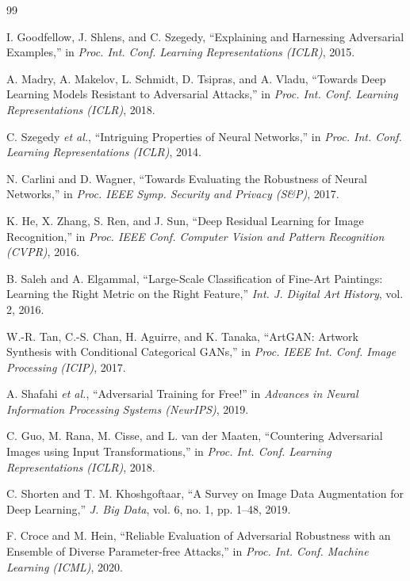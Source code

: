 \documentclass[conference]{IEEEtran}
\begin{document}
\begin{thebibliography}{99}

I. Goodfellow, J. Shlens, and C. Szegedy, ``Explaining and Harnessing Adversarial Examples,'' in \textit{Proc. Int. Conf. Learning Representations (ICLR)}, 2015.

A. Madry, A. Makelov, L. Schmidt, D. Tsipras, and A. Vladu, ``Towards Deep Learning Models Resistant to Adversarial Attacks,'' in \textit{Proc. Int. Conf. Learning Representations (ICLR)}, 2018.

C. Szegedy \textit{et al.}, ``Intriguing Properties of Neural Networks,'' in \textit{Proc. Int. Conf. Learning Representations (ICLR)}, 2014.

N. Carlini and D. Wagner, ``Towards Evaluating the Robustness of Neural Networks,'' in \textit{Proc. IEEE Symp. Security and Privacy (S\&P)}, 2017.

K. He, X. Zhang, S. Ren, and J. Sun, ``Deep Residual Learning for Image Recognition,'' in \textit{Proc. IEEE Conf. Computer Vision and Pattern Recognition (CVPR)}, 2016.

B. Saleh and A. Elgammal, ``Large-Scale Classification of Fine-Art Paintings: Learning the Right Metric on the Right Feature,'' \textit{Int. J. Digital Art History}, vol. 2, 2016.

W.-R. Tan, C.-S. Chan, H. Aguirre, and K. Tanaka, ``ArtGAN: Artwork Synthesis with Conditional Categorical GANs,'' in \textit{Proc. IEEE Int. Conf. Image Processing (ICIP)}, 2017.

A. Shafahi \textit{et al.}, ``Adversarial Training for Free!'' in \textit{Advances in Neural Information Processing Systems (NeurIPS)}, 2019.

C. Guo, M. Rana, M. Cisse, and L. van der Maaten, ``Countering Adversarial Images using Input Transformations,'' in \textit{Proc. Int. Conf. Learning Representations (ICLR)}, 2018.

C. Shorten and T. M. Khoshgoftaar, ``A Survey on Image Data Augmentation for Deep Learning,'' \textit{J. Big Data}, vol. 6, no. 1, pp. 1--48, 2019.

F. Croce and M. Hein, ``Reliable Evaluation of Adversarial Robustness with an Ensemble of Diverse Parameter-free Attacks,'' in \textit{Proc. Int. Conf. Machine Learning (ICML)}, 2020.


\end{thebibliography}
\end{document}

